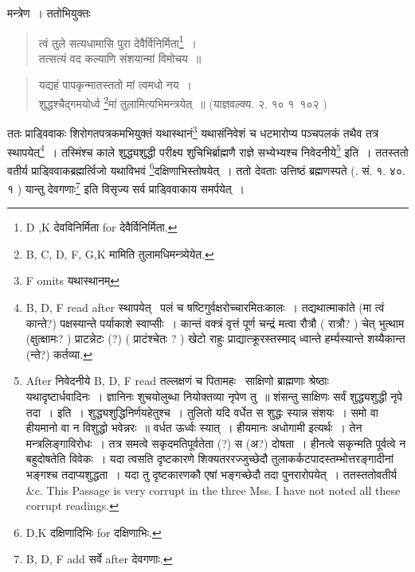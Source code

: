 \documentclass[11pt, openany]{book}
\begin{document}
\noindent
मन्त्रेण~। ततोभियुक्तः

\begin{quote}
{\vy त्वं तुले सत्यधामासि पुरा देवैर्विनिर्मिता\renewcommand{\thefootnote}{8}\footnote{D ,K देवविनिर्मिता for देवैर्विनिर्मिता.}~।\\
तत्सत्यं वद कल्याणि संशयान्मां विमोचय~॥}
\end{quote}
 
\newpage

\begin{quote}
{\vy यद्यहं पापकृन्मातस्ततो मां त्वमधो नय~।\\
शुद्धश्चैद्गमयोर्ध्व \renewcommand{\thefootnote}{1}\footnote{ B, C, D, F, G,K मामिति तुलामधिमन्त्र्येयेत.}मां तुलामित्यभिमन्त्रयेत्~॥} (याज्ञवल्क्य. २. १० १\textendash\ १०२ )
\end{quote}

ततः प्राड्विवाकः शिरोगतपत्रकमभियुक्तं यथास्थानं\renewcommand{\thefootnote}{2}\footnote{F omits यथास्थानम्} यथासंनिवेशं च धटमारोप्य पञ्चपलकं तथैव तत्र स्थापयेत्\renewcommand{\thefootnote}{3}\footnote{B, D, F read after स्थापयेत् \textendash\ पलं च षष्टिगुर्वक्षरोच्चारमितःकालः~। तद्यथात्माकांते (मा त्वं कान्ते?) पक्षस्यान्ते पर्याकाशे स्वाप्सीः~। कान्तं वक्त्रं वृत्तं पूर्ण चन्द्रं मत्वा रौत्रौ ( रात्रौ? ) चेत् भुत्थाम (क्षुत्क्षामः? ) प्राटन्नेटः (?) ( प्राटंश्चेतः ? ) खेटो राहुः प्राद्यात्क्रूरस्तस्माद् ध्वान्ते हर्म्यस्यान्ते शय्यैकान्त (न्ते?) कर्तव्या.}~। तस्मिंश्च काले शुद्ध्यशुद्धी परीक्ष्य शुचिभिर्ब्राह्मणै राज्ञे सभ्येभ्यश्च निवेदनीये\renewcommand{\thefootnote}{4}\footnote{After निवेदनीये B, D, F read तल्लक्षणं च पितामहः \textendash\ साक्षिणो ब्राह्मणाः श्रेष्ठाः यथादृष्टार्धवादिनः~। ज्ञानिनः शुचयोलुब्धा नियोक्तव्या नृपेण तु~॥ शंसन्तु साक्षिणः सर्वं शुद्ध्यशुद्धी नृपे तदा~। इति~। शुद्ध्यशुद्धिनिर्णयहेतुश्च~। तुलितो यदि वर्धेत स शुद्धः स्यान्न संशयः~। समो वा हीयमानो वा न विशुद्धो भवेन्नरः~॥ वर्धत ऊर्ध्वः स्यात्~। हीयमानः अधोगामी इत्यर्थः~। तेन मन्त्रलिङ्गाविरोधः~। तत्र समत्वे सकृदमतिपूर्वतेता (?) स (अ?) दोषता~। हीनत्वे सकृन्मति पूर्वत्वे न बहुदोषतेति विवेकः~। यदा त्वसति दृष्टकारणे शिक्यतररज्जुच्छेदौ तुलाकर्कटपादस्तम्भोत्तरङ्गादीनां भङ्गश्च तदाप्यशुद्धता~। यदा तु दृष्टकारणकौ एषां भङ्गच्छेदौ तदा पुनरारोपयेत्~। ततस्ततोवतीर्य \&c. This Passage is very corrupt in the three Mss. I have not noted all these corrupt readings.} इति~। ततस्ततो वतीर्य प्राड्विवाकब्रह्मर्त्विजो यथाविभवं \renewcommand{\thefootnote}{5}\footnote{D,K दक्षिणादिभिः for दक्षिणाभिः.}दक्षिणाभिस्तोषयेत्~। ततो देवताः उत्तिष्ठं ब्रह्मणस्पते (. सं. १. ४०. १ ) यान्तु देवगणाः\renewcommand{\thefootnote}{6}\footnote{B, D, F add सर्वे after देवगणाः.} इति विसृज्य सर्व प्राड्विवाकाय समर्पयेत्~।
\end{document}
